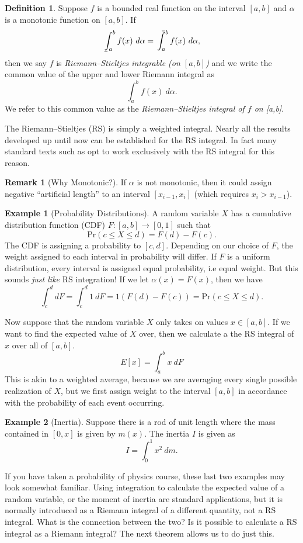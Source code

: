 \documentclass{article}
\def\upint{\mathchoice%
	{\mkern13mu\overline{\vphantom{\intop}\mkern7mu}\mkern-20mu}%
	{\mkern7mu\overline{\vphantom{\intop}\mkern7mu}\mkern-14mu}%
	{\mkern7mu\overline{\vphantom{\intop}\mkern7mu}\mkern-14mu}%
	{\mkern7mu\overline{\vphantom{\intop}\mkern7mu}\mkern-14mu}%
	\int}
\def\lowint{\mkern3mu\underline{\vphantom{\intop}\mkern7mu}\mkern-10mu\int}
\newcommand{\Prr}[1]{\text{Pr}\left(#1\right)}
\theoremstyle{definition}
\newtheorem{definition}{Definition}[section]
\newtheorem{example}{Example}[section]
\newtheorem{remark}{Remark}[section]
\begin{document}
\begin{definition}
	Suppose $ f $ is a bounded real function  on the interval $ [a,b] $ and $ \alpha $ is a monotonic function on $ [a,b] $. If $$ \lowint_a^b f(x)\ d\alpha=\upint_a^b f(x)\ d\alpha,$$ then we say $ f $ is \textit{\color{red}Riemann–Stieltjes integrable (on $ [a,b] $)} and we write the common value of the upper and lower Riemann integral as $$ \int_{a}^{b}f(x)\ d\alpha.$$ We refer to this common value as the \textit{\color{red}Riemann–Stieltjes integral of $ f $ on [a,b]}. 
\end{definition}
The Riemann–Stieltjes (RS) is simply a weighted integral. Nearly all the results developed up until now can be established for the RS integral. In fact many standard texts such as \cite{rudin1964principles} opt to work exclusively with the RS integral for this reason. 
\begin{remark}[Why Monotonic?]
	If $ \alpha $ is not monotonic, then it could assign negative ``artificial length'' to an interval $ [x_{i-1},x_{i}] $ (which requires $ x_i >x_{i-1}$). 
\end{remark}
\begin{example}[Probability Distributions]
	A random variable $ X $ has a cumulative distribution function (CDF) $ F:[a,b]\to[0,1] $ such that $$ \Prr{c\le X\le d}=F(d)-F(c).$$ The CDF is assigning a probability to $ [c,d] $. Depending on our choice of $ F $, the weight assigned to each interval in probability will differ. If $ F $ is a uniform distribution, every interval is assigned equal probability, i.e equal weight. But this sounds \textit{just like} RS integration! If we let $ \alpha(x)=F(x) $, then we have $$\int_{c}^{d} dF=\int_{c}^{d}1\ dF=1(F(d)-F(c))=\Prr{c\le X\le d}. $$ 
	
	Now suppose that the random variable $ X $ only takes on values $ x\in[a,b] $. If we want to find the expected value of $ X $ over, then we calculate a the RS integral of $ x $ over all of $ [a,b] $. $$ E[x]=\int_{a}^{b}x\ dF$$ This is akin to a weighted average, because we are averaging every single possible realization of $ X $, but we first assign weight to the interval $ [a,b] $ in accordance with the probability of each event occurring. 
\end{example}
\begin{example}[Inertia]
	Suppose there is a rod of unit length where the mass contained in $ [0,x] $ is given by $ m(x) $. The inertia $ I $ is given as $$ I=\int_{0}^{1}x^2\ dm.$$ 
\end{example}
If you have taken a probability of physics course, these last two examples may look somewhat familiar. Using integration to calculate the expected value of a random variable, or the moment of inertia are standard applications, but it is normally introduced as a Riemann integral of a different quantity, not a RS integral. What is the connection between the two? Is it possible to calculate a RS integral as a Riemann integral? The next theorem allows us to do just this.
\end{document}
